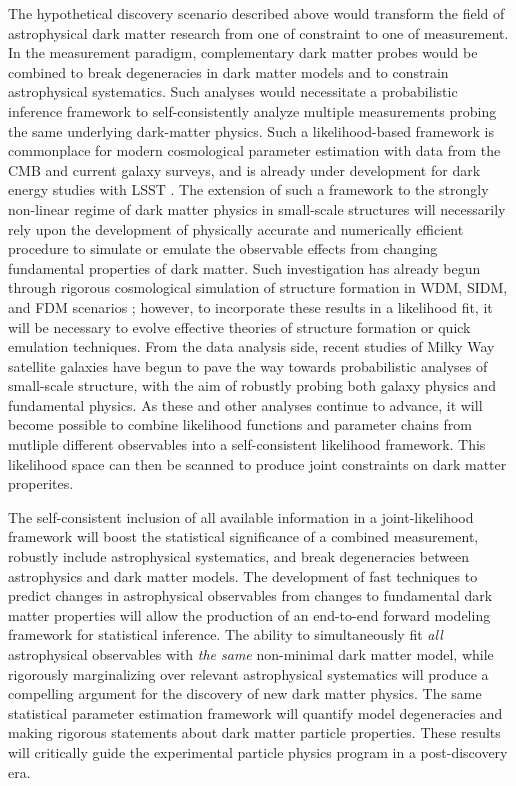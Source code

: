 The hypothetical discovery scenario described above would transform the field of astrophysical dark matter research from one of constraint to one of measurement.
In the measurement paradigm, complementary dark matter probes would be combined to break degeneracies in dark matter models and to constrain astrophysical systematics.
Such analyses would necessitate a probabilistic inference framework to self-consistently analyze multiple measurements probing the same underlying dark-matter physics. 
Such a likelihood-based framework is commonplace for modern cosmological parameter estimation with data from the CMB and current galaxy surveys, and is already under development for dark energy studies with LSST \citep{DESC:CCL}. 
The extension of such a framework to the strongly non-linear regime of dark matter physics in small-scale structures will necessarily rely upon the development of physically accurate and numerically efficient procedure to simulate or emulate the observable effects from changing fundamental properties of dark matter.
Such investigation has already begun through rigorous cosmological simulation of structure formation in WDM, SIDM, and FDM scenarios \citep[\eg][]{Lovell:2013ola,Dooley:2016ajo,1807.06018,1811.11791}; however, to incorporate these results in a likelihood fit, it will be necessary to evolve effective theories of structure formation \citep[\eg][]{Cyr-Racine:2015ihg} or quick emulation techniques.
From the data analysis side, recent studies of Milky Way satellite galaxies \citep[\eg][]{Jethwa:2018,Nadler:2018} have begun to pave the way towards probabilistic analyses of small-scale structure, with the aim of robustly probing both galaxy physics and fundamental physics.
As these and other analyses continue to advance, it will become possible to combine likelihood functions and parameter chains from mutliple different observables into a self-consistent likelihood framework. 
This likelihood space can then be scanned to produce joint constraints on dark matter properites.

The self-consistent inclusion of all available information in a joint-likelihood framework will boost the statistical significance of a combined measurement, robustly include astrophysical systematics, and break degeneracies between astrophysics and dark matter models.
The development of fast techniques to predict changes in astrophysical observables from changes to fundamental dark matter properties will allow the production of an end-to-end forward modeling framework for statistical inference.
The ability to simultaneously fit \textit{all} astrophysical observables with \emph{the same} non-minimal dark matter model, while rigorously marginalizing over relevant astrophysical systematics will produce a compelling argument for the discovery of new dark matter physics.
The same statistical parameter estimation framework will quantify model degeneracies and making rigorous statements about dark matter particle properties.
These results will critically guide the experimental particle physics program in a post-discovery era.

